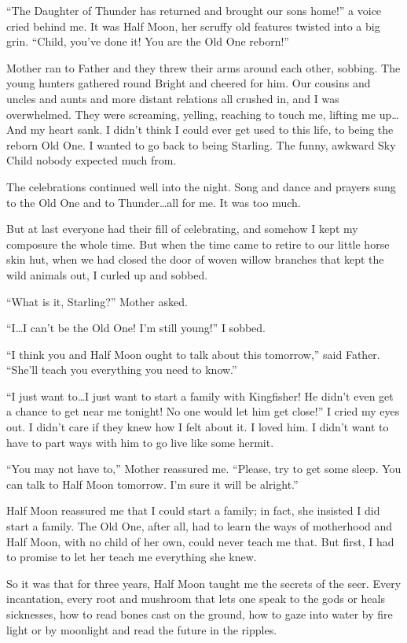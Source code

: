 ``The Daughter of Thunder has returned and brought our sons home!'' a voice cried behind me. It was Half Moon, her scruffy old features twisted into a big grin. ``Child, you've done it! You are the Old One reborn!''

Mother ran to Father and they threw their arms around each other, sobbing. The young hunters gathered round Bright and cheered for him. Our cousins and uncles and aunts and more distant relations all crushed in, and I was overwhelmed. They were screaming, yelling, reaching to touch me, lifting me up\ldots{}And my heart sank. I didn't think I could ever get used to this life, to being the reborn Old One. I wanted to go back to being Starling. The funny, awkward Sky Child nobody expected much from.

The celebrations continued well into the night. Song and dance and prayers sung to the Old One and to Thunder\ldots{}all for me. It was too much.

But at last everyone had their fill of celebrating, and somehow I kept my composure the whole time. But when the time came to retire to our little horse skin hut, when we had closed the door of woven willow branches that kept the wild animals out, I curled up and sobbed.

``What is it, Starling?'' Mother asked.

``I\ldots{}I can't be the Old One! I'm still young!'' I sobbed.

``I think you and Half Moon ought to talk about this tomorrow,'' said Father. ``She'll teach you everything you need to know.''

``I just want to\ldots{}I just want to start a family with Kingfisher! He didn't even get a chance to get near me tonight! No one would let him get close!'' I cried my eyes out. I didn't care if they knew how I felt about it. I loved him. I didn't want to have to part ways with him to go live like some hermit.

``You may not have to,'' Mother reassured me. ``Please, try to get some sleep. You can talk to Half Moon tomorrow. I'm sure it will be alright.''

\secdiv

\noindent Half Moon reassured me that I could start a family; in fact, she insisted I did start a family. The Old One, after all, had to learn the ways of motherhood and Half Moon, with no child of her own, could never teach me that. But first, I had to promise to let her teach me everything she knew.

So it was that for three years, Half Moon taught me the secrets of the seer. Every incantation, every root and mushroom that lets one speak to the gods or heals sicknesses, how to read bones cast on the ground, how to gaze into water by fire light or by moonlight and read the future in the ripples.

